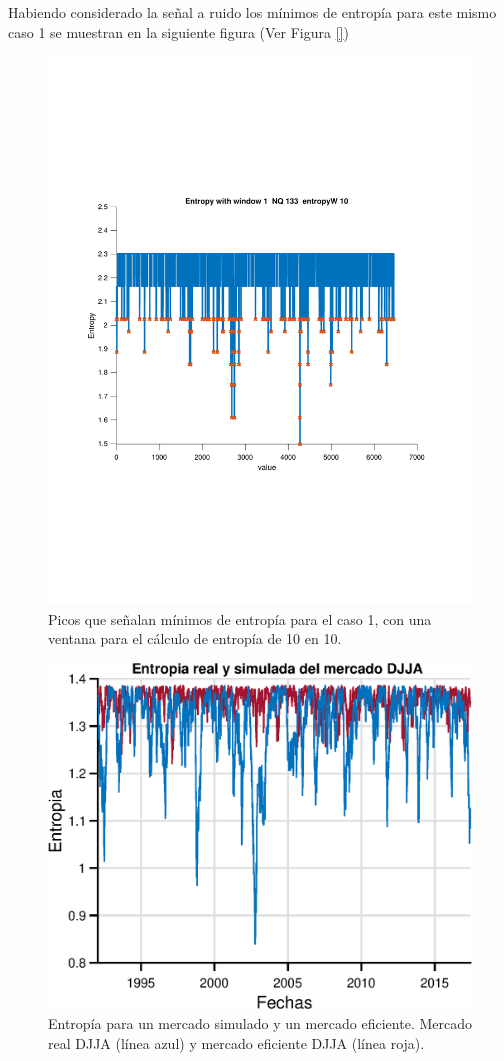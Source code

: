 Habiendo considerado la señal a ruido los mínimos de entropía para este mismo caso 1 se muestran en la siguiente figura (Ver Figura \ref{})

\begin{figure}[h]
	\centering
	\includegraphics[width=0.7\linewidth]{figures_matlab/Entropy_window_1_NQ_133_entropyW_10}
	\caption{Picos que señalan mínimos de entropía para el caso 1, con una ventana para el cálculo de entropía de 10 en 10. }
	\label{caso1entropy_individual}
\end{figure}


\begin{figure}[h]
	\centering
	\includegraphics[width=0.7\linewidth]{figures/onlyentropyeps}
	\caption{Entropía para un mercado simulado y un mercado eficiente. Mercado real DJJA (línea azul) y mercado eficiente DJJA (línea roja).}
	\label{onlyentropyeps}
\end{figure}




